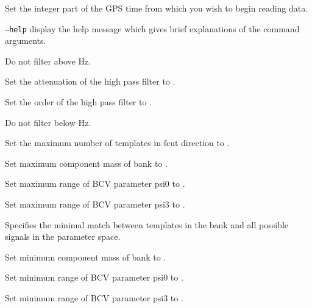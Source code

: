 \begin{entry}
\item[\option{--gps-start-time} \parm{gps\_start}] 
Set the integer part of the GPS time  from which you wish to begin reading data.

\item[\texttt{--help}] display the help message which gives brief explanations
of the command arguments.  

\item[\option{--high-frequency-cutoff} \parm{cuthigh}] 
Do not filter above  Hz.

\item[\option{--high-pass-attenuation} \parm{high\_atten}] 
Set the attenuation of the high pass filter to .

\item[\option{--high-pass-order} \parm{high\_order}] 
Set the order of the high pass filter to .

\item[\option{--low-frequency-cutoff} \parm{cutlow}] 
Do not filter below  Hz.

\item[\option{-maximum-fcut-tmplts} \parm{ maxTemp}] 
Set the maximum number of templates in fcut direction to .

\item[\option{--maximum-mass} \parm{maxmass}] 
Set maximum component mass of bank to .

\item[\option{--maximum-psi0} \parm{psi0max}] 
Set maximum range of BCV parameter psi0 to .

\item[\option{--maximum-psi3} \parm{psi3max}] 
Set maximum range of BCV parameter psi3 to  .

\item[\option{--minimal-match} \parm{match}] 
Specifies the minimal match  between templates in the 
bank and all possible signals in the parameter space.

\item[\option{--minimum-mass} \parm{minmass}] 
Set minimum component mass of bank to .

\item[\option{--minimum-psi0} \parm{psi0min}] 
Set minimum range of BCV parameter psi0 to .

\item[\option{--minimum-psi3} \parm{psi3min}] 
Set minimum range of BCV parameter psi3 to .


\end{entry}
